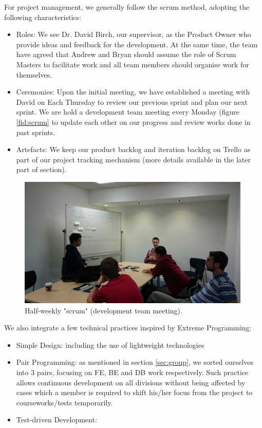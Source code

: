 \documentclass[a4paper]{article}
\begin{document}
For project management, we generally follow the scrum method, adopting the
following characteristics:
\begin{itemize}
  \item Roles: We see Dr. David Birch, our supervisor, as the Product Owner
        who provide ideas and feedback for the development. At the same time,
        the team have agreed that Andrew and Bryan should assume the role of
        Scrum Masters to facilitate work and all team members should organise
        work for themselves.
  \item Ceremonies: Upon the initial meeting, we have established a
        meeting with David on Each Thursday to review our previous sprint 
        and plan our next sprint. We are hold a development team
        meeting every Monday (figure \ref{fid:scrum} to update each other 
        on our progress and review works done in past sprints.
  \item Artefacts: We keep our product backlog and iteration backlog on
        Trello as part of our project tracking mechanism (more details
        available in the later part of section).
\end{itemize}


\begin{figure}[ht]
  \centering
    \includegraphics[width = 0.99\textwidth]{./planning/scrum.jpg}
   
  \caption{Half-weekly "scrum" (development team meeting).}
  \label{fig:scrum}
\end{figure}

We also integrate a few technical practices inspired by Extreme Programming:
\begin{itemize}
  \item Simple Design: including the use of lightweight technologies
  \item Pair Programming: as mentioned in section \ref{sec:group}, we sorted
        ourselves into 3 pairs, focusing on FE, BE and DB work respectively.
        Such practice allows continuous development on all divisions without
        being affected by cases which a member is required to shift his/her
        focus from the project to courseworks/tests temporarily.
  \item Test-driven Development: %

\end{itemize} 
\end{document}
